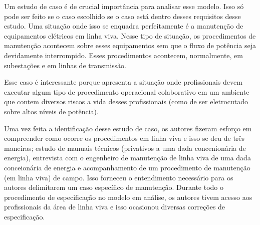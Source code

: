 Um estudo de caso é de crucial importância para analisar esse modelo. Isso só pode ser feito se o caso escolhido se o caso está dentro desses requisitos desse estudo. Uma situação onde isso se enquadra perfeitamente é a manutenção de equipamentos elétricos em linha viva. Nesse tipo de situação, os procedimentos de manutenção acontecem sobre esses equipamentos sem que o fluxo de potência seja devidamente interrompido. Esses procedimentos acontecem, normalmente, em subestações e em linhas de transmissão. 

Esse caso é interessante porque apresenta a situação onde profissionais devem executar algum tipo de procedimento operacional colaborativo em um ambiente que contem diversos riscos a vida desses profissionais (como de ser eletrocutado sobre altos níveis de potência).

Uma vez feita a identificação desse estudo de caso, os autores fizeram esforço em compreender como ocorre os procedimentos em linha viva e isso se deu de três maneiras; 
estudo de manuais técnicos (privativos a uma dada concenionária de energia), entrevista com o engenheiro de manutenção de linha viva de uma dada conceionária de energia e acompanhamento de um procedimento de manutenção (em linha viva) de campo. Isso forneceu o entendimento necessário para os autores delimitarem um caso específico de manutenção. Durante todo o procedimento de especificação no modelo em análise, os autores tivem acesso aos profissionais da área de linha viva e isso ocasionou diversas correções de especificação.  